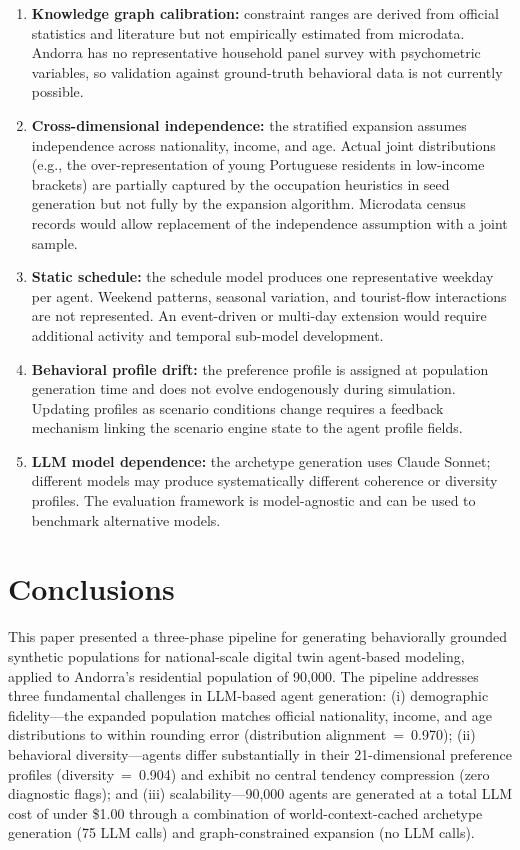 \documentclass[sustainability,article,submit,pdftex,moreauthors]{Definitions/mdpi}
\begin{document}
\begin{enumerate}
\item \textbf{Knowledge graph calibration:} constraint ranges are derived
      from official statistics and literature but not empirically estimated
      from microdata. Andorra has no representative household panel survey
      with psychometric variables, so validation against ground-truth
      behavioral data is not currently possible.
\item \textbf{Cross-dimensional independence:} the stratified expansion
      assumes independence across nationality, income, and age. Actual
      joint distributions (e.g., the over-representation of young
      Portuguese residents in low-income brackets) are partially captured
      by the occupation heuristics in seed generation but not fully by
      the expansion algorithm. Microdata census records would allow
      replacement of the independence assumption with a joint sample.
\item \textbf{Static schedule:} the schedule model produces one
      representative weekday per agent. Weekend patterns, seasonal
      variation, and tourist-flow interactions are not represented.
      An event-driven or multi-day extension would require additional
      activity and temporal sub-model development.
\item \textbf{Behavioral profile drift:} the preference profile is
      assigned at population generation time and does not evolve
      endogenously during simulation. Updating profiles as scenario
      conditions change requires a feedback mechanism linking the
      scenario engine state to the agent profile fields.
\item \textbf{LLM model dependence:} the archetype generation uses
      Claude Sonnet; different models may produce systematically
      different coherence or diversity profiles. The evaluation
      framework is model-agnostic and can be used to benchmark
      alternative models.
\end{enumerate}

\section{Conclusions}
\label{sec:conclusions}

This paper presented a three-phase pipeline for generating behaviorally
grounded synthetic populations for national-scale digital twin agent-based
modeling, applied to Andorra's residential population of 90,000. The
pipeline addresses three fundamental challenges in LLM-based agent generation:
(i) demographic fidelity---the expanded population matches official nationality,
income, and age distributions to within rounding error (distribution
alignment~=~0.970); (ii) behavioral diversity---agents differ substantially
in their 21-dimensional preference profiles (diversity~=~0.904) and exhibit
no central tendency compression (zero diagnostic flags); and (iii)
scalability---90,000 agents are generated at a total LLM cost of under
\$1.00 through a combination of world-context-cached archetype generation
(75 LLM calls) and graph-constrained expansion (no LLM calls).
\end{document}
